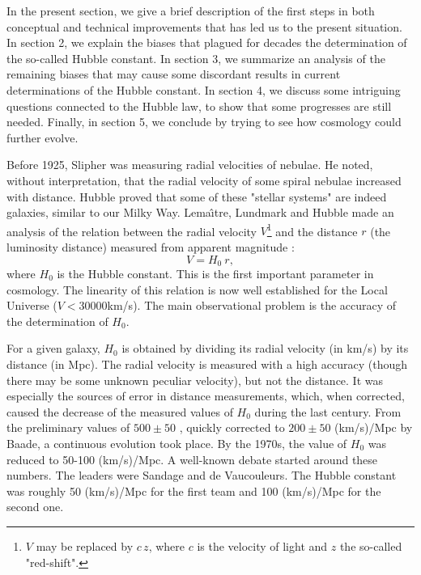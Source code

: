In the present section,  we give a brief description of the first steps in both conceptual and technical improvements that has led us to 
the present situation.
In section 2, we explain the biases that plagued for decades the determination of the so-called Hubble constant. In section 3, we summarize an analysis of the remaining biases that may cause some discordant results in current determinations of the Hubble constant. In section 4,  we discuss some intriguing questions connected to the Hubble law, to show that some progresses are still needed. Finally, in section 5, we conclude by trying to see how cosmology could further evolve.


Before 1925, Slipher was measuring\cite{vesto} radial velocities of nebulae. He noted, without interpretation, that the radial velocity of  some spiral nebulae increased with distance. Hubble proved that some of these "stellar systems" are indeed galaxies, similar to our Milky Way.  Lema\^{\i}tre\cite{lemaitre}, Lundmark\cite{lundmark} and Hubble  \cite{edwin} made an analysis of the relation between the radial velocity $V$\footnote{$V$ may be replaced by $c\,z$, where $c$ is the velocity of light and $z$ the so-called "red-shift".}
and the distance $r$  (the luminosity distance) measured from apparent magnitude :
\begin{equation}
V= H_0 \  r ,
\label{hubl}
\end{equation} 
where $H_0$  is the Hubble constant. This is the first important parameter in cosmology. The linearity of this relation is now well established for the Local Universe  ($V<30000$km/s). The main observational problem is the accuracy of the determination of $H_0$.
 

For a given galaxy, $H_0$ is obtained by dividing its radial velocity (in km/s) by its distance (in Mpc). The radial velocity is measured with a high accuracy (though there may be some unknown peculiar velocity), but not the distance. It was especially the sources of error in distance measurements, which, when corrected, caused the decrease of the measured values of $H_0$ during the last century. From the preliminary values of $500 \pm 50$ , quickly corrected to $200 \pm 50$ (km/s)/Mpc  by Baade, a continuous evolution took place. By the 1970s, the value of $H_0$ was reduced to 50-100 (km/s)/Mpc. A well-known debate \cite{deba1,deba2} started around these numbers. The leaders were Sandage and de Vaucouleurs. The Hubble constant was roughly 50 (km/s)/Mpc for the first team and 100 (km/s)/Mpc  for the second one.

